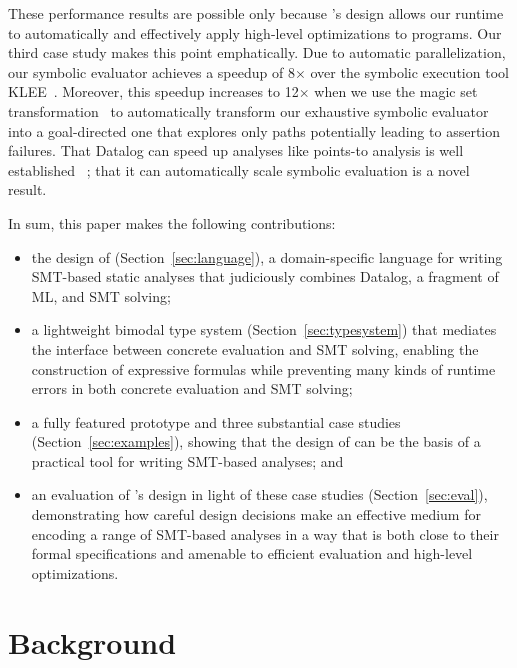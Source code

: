 \documentclass[acmsmall,screen,nonacm]{acmart}
\theoremstyle{definition}
\begin{document}
These performance results are possible only because \Name's design allows
our runtime to automatically and effectively apply high-level optimizations to
\Name programs.
Our third case study makes this point emphatically.
Due to automatic parallelization, our symbolic evaluator achieves a speedup
of 8$\times$ over %
the symbolic execution tool
KLEE~\citep{klee}.
Moreover, this speedup increases to 12$\times$ when we use the magic set
transformation~\citep{magicsets1,magicsets2} to automatically transform our
exhaustive symbolic evaluator into a goal-directed one that explores only paths
potentially leading to assertion failures.
That Datalog can speed up analyses like points-to analysis is well established
~\citep{bddbddbPointer,doop}; that it can automatically scale symbolic
evaluation is a novel result.
\smallskip

In sum, this paper makes the following contributions:
\begin{itemize}
  \item the design of \Name (Section~\ref{sec:language}), a domain-specific
    language for writing SMT-based static analyses that judiciously combines
    Datalog, a fragment of ML, and SMT solving;
  \item a lightweight bimodal type system (Section~\ref{sec:typesystem}) that
    mediates the interface between concrete evaluation and SMT solving,
    enabling the construction of expressive formulas while preventing many
    kinds of runtime errors in both concrete evaluation and SMT solving;
  \item a fully featured prototype and three substantial case studies
    (Section~\ref{sec:examples}), showing that the design of \Name can be the
    basis of a practical tool for writing SMT-based analyses; and
  \item an evaluation of \Name's design in light of these case studies
    (Section~\ref{sec:eval}), demonstrating how careful design decisions make
    \Name an effective medium for encoding a range of SMT-based analyses in a
    way that is both close to their formal specifications and amenable to
    efficient evaluation and high-level optimizations.
\end{itemize}

\section{Background}\label{sec:background}
\end{document}
